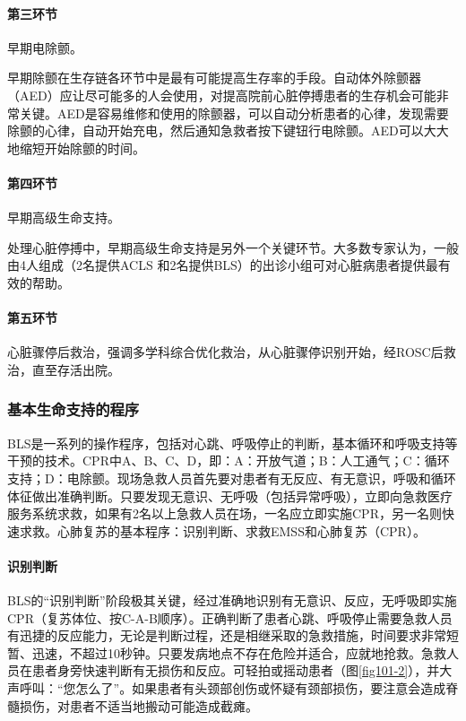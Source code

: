 \paragraph{第三环节}

早期电除颤。

早期除颤在生存链各环节中是最有可能提高生存率的手段。自动体外除颤器（AED）应让尽可能多的人会使用，对提高院前心脏停搏患者的生存机会可能非常关键。AED是容易维修和使用的除颤器，可以自动分析患者的心律，发现需要除颤的心律，自动开始充电，然后通知急救者按下键钮行电除颤。AED可以大大地缩短开始除颤的时间。

\paragraph{第四环节}

早期高级生命支持。

处理心脏停搏中，早期高级生命支持是另外一个关键环节。大多数专家认为，一般由4人组成（2名提供ACLS
和2名提供BLS）的出诊小组可对心脏病患者提供最有效的帮助。

\paragraph{第五环节}

心脏骤停后救治，强调多学科综合优化救治，从心脏骤停识别开始，经ROSC后救治，直至存活出院。

\subsubsection{基本生命支持的程序}

BLS是一系列的操作程序，包括对心跳、呼吸停止的判断，基本循环和呼吸支持等干预的技术。CPR中A、B、C、D，即：A：开放气道；B：人工通气；C：循环支持；D：电除颤。现场急救人员首先要对患者有无反应、有无意识，呼吸和循环体征做出准确判断。只要发现无意识、无呼吸（包括异常呼吸），立即向急救医疗服务系统求救，如果有2名以上急救人员在场，一名应立即实施CPR，另一名则快速求救。心肺复苏的基本程序：识别判断、求救EMSS和心肺复苏（CPR）。

\paragraph{识别判断}

BLS的“识别判断”阶段极其关键，经过准确地识别有无意识、反应，无呼吸即实施CPR（复苏体位、按C-A-B顺序）。正确判断了患者心跳、呼吸停止需要急救人员有迅捷的反应能力，无论是判断过程，还是相继采取的急救措施，时间要求非常短暂、迅速，不超过10秒钟。只要发病地点不存在危险并适合，应就地抢救。急救人员在患者身旁快速判断有无损伤和反应。可轻拍或摇动患者（图\ref{fig101-2}），并大声呼叫：“您怎么了”。如果患者有头颈部创伤或怀疑有颈部损伤，要注意会造成脊髓损伤，对患者不适当地搬动可能造成截瘫。

